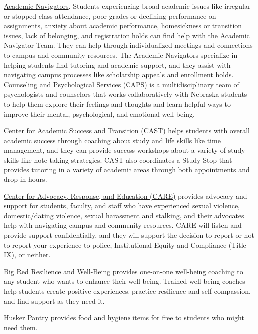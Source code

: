 \documentclass[12pt]{amsart}
\begin{document}
\noindent
\href{https://executivevc.unl.edu/academic-navigator-team}{Academic Navigators}. Students experiencing broad academic issues like irregular or stopped class attendance, poor grades or declining performance on assignments, anxiety about academic performance, homesickness or transition issues, lack of belonging, and registration holds can find help with the Academic Navigator Team.  They can help through individualized meetings and connections to campus and community resources.  The Academic Navigators specialize in helping students find tutoring and academic support, and they assist with navigating campus processes like scholarship appeals and enrollment holds.
\medskip
\noindent
\href{https://caps.unl.edu}{Counseling and Psychological Services (CAPS)} 
is a multidisciplinary team of psychologists and counselors that works collaboratively with Nebraska students to help them explore their feelings and thoughts and learn helpful ways to improve their mental, psychological, and emotional well-being. 

\medskip
\noindent
\href{https://success.unl.edu}{Center for Academic Success and Transition (CAST)}
helps students with overall academic success through coaching about study and life skills like time management, and they can provide success workshops about a variety of study skills like note-taking strategies.  CAST also coordinates a Study Stop that provides tutoring in a variety of academic areas through both appointments and drop-in hours.

\medskip
\noindent
\href{https://care.unl.edu}{Center for Advocacy, Response, and Education (CARE)} 
provides advocacy and support for students, faculty, and staff who have experienced sexual violence, domestic/dating violence, sexual harassment and stalking, and their advocates help with navigating campus and community resources.  CARE will listen and provide support confidentially, and they will support the decision to report or not to report your experience to police, Institutional Equity and Compliance (Title IX), or neither. 

\medskip
\noindent
\href{https://resilience.unl.edu/home}{Big Red Resilience and Well-Being} provides one-on-one well-being coaching to any student who wants to enhance their well-being. Trained well-being coaches help students create positive experiences, practice resilience and self-compassion, and find support as they need it.

\medskip
\noindent
\href{https://pantry.unl.edu}{Husker Pantry} provides food and hygiene items for free to students who might need them.
\end{document}
